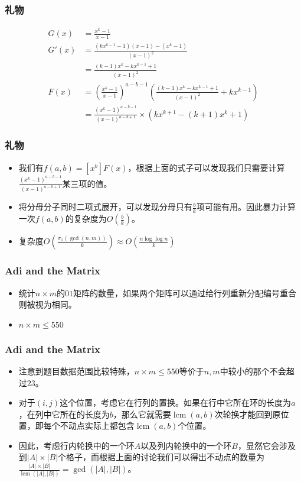 \documentclass{beamer}
\begin{document}
\begin{frame}
    \frametitle{礼物}
    $$\begin{aligned}
        G(x) &= \frac{x^k - 1}{x - 1}\\
        G'(x) &= \frac{(kx^{k - 1} - 1)(x - 1) - (x^k - 1)}{(x - 1)^2}\\
        &= \frac{(k - 1)x^k - kx^{k - 1} + 1}{(x - 1)^2}\\
        F(x) &= \left(\frac{x^k - 1}{x - 1}\right)^{a - b - 1}\left(\frac{(k - 1)x^k - kx^{k - 1} + 1}{(x - 1)^2} + kx^{k - 1}\right)\\
        &= \frac{(x^k - 1)^{a - b - 1}}{(x - 1)^{a - b + 1}} \times (kx^{k + 1} - (k + 1)x^k + 1)
    \end{aligned}$$
\end{frame}

\begin{frame}
    \frametitle{礼物}
    \begin{itemize}
        \item 我们有$f(a, b) = [x^b]F(x)$，根据上面的式子可以发现我们只需要计算$\frac{(x^k - 1)^{a - b - 1}}{(x - 1)^{a - b + 1}}$某三项的值。
        \item 将分母分子同时二项式展开，可以发现分母只有$\frac bk$项可能有用。因此暴力计算一次$f(a, b)$的复杂度为$O(\frac bk)$。
        \item 复杂度$O(\frac{\sigma_1(\gcd(n, m))}{k}) \approx O(\frac{n\log\log n}{k})$
    \end{itemize}
\end{frame}

\begin{frame}
    \frametitle{Adi and the Matrix}
    \begin{itemize}
        \item 统计$n\times m$的$01$矩阵的数量，如果两个矩阵可以通过给行列重新分配编号重合则被视为相同。
        \item $n\times m\leq 550$
    \end{itemize}
\end{frame}

\begin{frame}
    \frametitle{Adi and the Matrix}
    \begin{itemize}
        \item 注意到题目数据范围比较特殊，$n\times m\leq 550$等价于$n, m$中较小的那个不会超过$23$。
        \item 对于$(i, j)$这个位置，考虑它在行列的置换。如果在行中它所在环的长度为$a$，在列中它所在的长度为$b$，那么它就需要$\operatorname{lcm}(a, b)$次轮换才能回到原位置，即每个不动点实际上都包含$\operatorname{lcm}(a, b)$个位置。
        \item 因此，考虑行内轮换中的一个环$A$以及列内轮换中的一个环$B$，显然它会涉及到$|A|\times|B|$个格子，而根据上面的讨论我们可以得出不动点的数量为$\frac{|A|\times |B|}{\operatorname{lcm}(|A|, |B|)} = \gcd(|A|, |B|)$。
    \end{itemize}
\end{frame}
\end{document}
